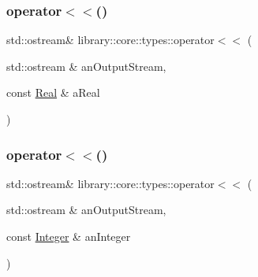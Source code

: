 \mbox{\label{namespacelibrary_1_1core_1_1types_af9123a41f1061b37fc719e25761f33a2}} 
\subsubsection{\texorpdfstring{operator$<$$<$()}{operator<<()}\hspace{0.1cm}{\footnotesize\ttfamily [1/2]}}
{\footnotesize\ttfamily std\+::ostream\& library\+::core\+::types\+::operator$<$$<$ (\begin{DoxyParamCaption}\item[{std\+::ostream \&}]{an\+Output\+Stream,  }\item[{const \hyperlink{classlibrary_1_1core_1_1types_1_1Real}{Real} \&}]{a\+Real }\end{DoxyParamCaption})}

\mbox{\label{namespacelibrary_1_1core_1_1types_a8fcd2efaf239710c5a837397cdb69968}} 
\subsubsection{\texorpdfstring{operator$<$$<$()}{operator<<()}\hspace{0.1cm}{\footnotesize\ttfamily [2/2]}}
{\footnotesize\ttfamily std\+::ostream\& library\+::core\+::types\+::operator$<$$<$ (\begin{DoxyParamCaption}\item[{std\+::ostream \&}]{an\+Output\+Stream,  }\item[{const \hyperlink{classlibrary_1_1core_1_1types_1_1Integer}{Integer} \&}]{an\+Integer }\end{DoxyParamCaption})}

